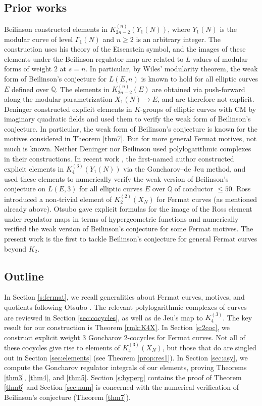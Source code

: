 \documentclass[11pt,a4,leqno]{amsart}
\theoremstyle{my theoremstyle}
\theoremstyle{dfn}
\theoremstyle{remark}
\renewcommand{\1}{\mathbbm{1}}
\newcommand{\Q}{\mathbb{Q}}
\numberwithin{equation}{section}
\begin{document}
\subsection{Prior works}

Beilinson \cite{Bei86} constructed elements in $K^{(n)}_{2n-2}(Y_1(N))$, where $Y_1(N)$ is the modular curve of level $\Gamma_1(N)$ and $n \geq 2$ is an arbitrary integer. The construction uses his theory of the Eisenstein symbol, and the images of these elements under the Beilinson regulator map are related to $L$-values of modular forms of weight $2$ at $s=n$. In particular, by Wiles' modularity theorem, the weak form of Beilinson's conjecture for $L(E,n)$ is known to hold for all elliptic curves $E$ defined over $\Q$. The elements in $K^{(n)}_{2n-2}(E)$ are obtained via push-forward along the modular parametrization $X_1(N) \to E$, and are therefore not explicit. Deninger \cite{Deninger90} constructed explicit elements in $K$-groups of elliptic curves with CM by imaginary quadratic fields and used them to verify the weak form of Beilinson's conjecture. In particular, the weak form of Beilinson's conjecture is known for the motives considered in Theorem \ref{thm7}. But for more general Fermat motives, not much is known. Neither Deninger nor Beilinson used polylogarithmic complexes in their constructions. In recent work \cite{Bru20}, the first-named author constructed explicit elements in $K_4^{(3)}(Y_1(N))$ via the Goncharov--de Jeu method, and used these elements to numerically verify the weak version of Beilinson's conjecture on $L(E,3)$ for all elliptic curves $E$ over $\Q$ of conductor $\leq 50$. Ross \cite{Ross94} introduced a non-trivial element of $K_2^{(2)}(X_N)$ for Fermat curves (as mentioned already above). 
Otsubo \cite{Ots11} gave explicit formulas for the image of the Ross element under regulator maps in terms of hypergeometric functions and numerically verified the weak version of Beilinson's conjecture for some Fermat motives. The present work is the first to tackle Beilinson's conjecture for general Fermat curves beyond $K_2$. 

\subsection{Outline}

In Section \ref{s:fermat}, we recall generalities about Fermat curves, motives, and quotients following Otsubo \cite{Ots11}. 
The relevant polylogarithmic complexes of curves are reviewed in Section \ref{sec:cocycles}, as well as de Jeu's map to $K_4^{(3)}$. The key result for our construction is Theorem \ref{rmk:K4X}. In Section \ref{s:2coc}, we construct explicit weight $3$ Goncharov $2$-cocycles for Fermat curves. Not all of these cocycles give rise to elements of $K_4^{(3)}(X_N)$, but those that do are singled out in Section \ref{sec:elements} (see Theorem \ref{prop:res1}). In Section \ref{sec:asy}, we compute the Goncharov regulator integrals of our elements, proving Theorems \ref{thm3}, \ref{thm4}, and \ref{thm5}. Section \ref{s:hyperg} contains the proof of Theorem \ref{thm6} and Section \ref{sec:num} is concerned with the numerical verification of Beilinson's conjecture (Theorem \ref{thm7}).
\end{document}
